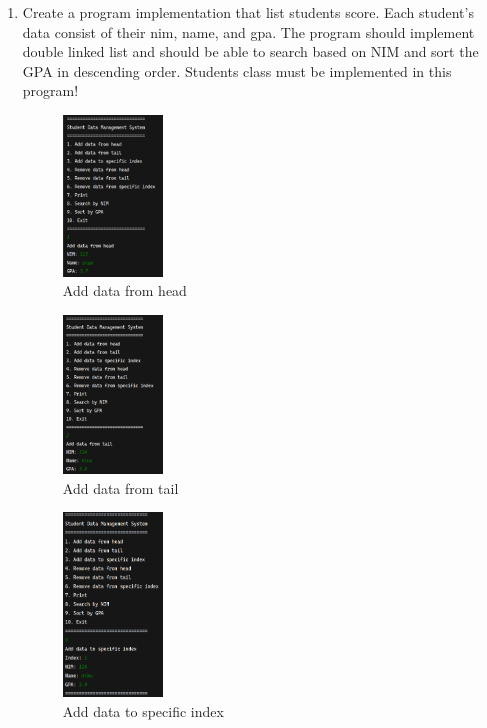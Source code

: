 \documentclass[12pt,titlepage]{article}
\begin{document}
\begin{enumerate}
{    }
    \pagebreak
    \item {
        Create a program implementation that list students score. Each student’s data consist of their
        nim, name, and gpa. The program should implement double linked list and should be able to
        search based on NIM and sort the GPA in descending order. Students class must be
        implemented in this program!

        \begin{figure}[h]
            \centering
            \includegraphics[width=0.25\textwidth]{./images/4-1.png}
            \caption{Add data from head}
        \end{figure}

        \begin{figure}[h]
            \centering
            \includegraphics[width=0.25\textwidth]{./images/4-2.png}
            \caption{Add data from tail}
        \end{figure}

        \begin{figure}[h]
            \centering
            \includegraphics[width=0.25\textwidth]{./images/4-3.png}
            \caption{Add data to specific index}
        \end{figure}

}
\end{enumerate}
\end{document}
